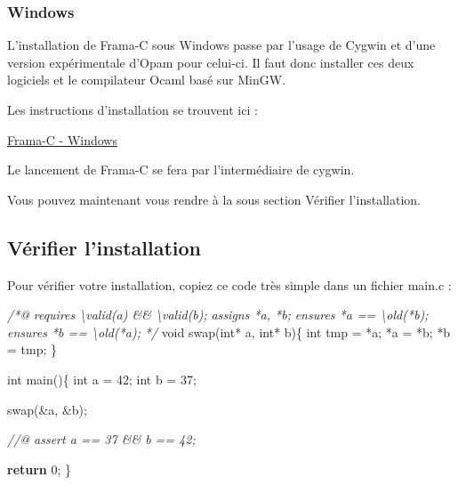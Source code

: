 \documentclass[12pt,francais,]{scrbook}
\newenvironment{Shaded}{}{}
\newcommand{\KeywordTok}[1]{\textcolor[rgb]{0.00,0.44,0.13}{\textbf{{#1}}}}
\newcommand{\DataTypeTok}[1]{\textcolor[rgb]{0.56,0.13,0.00}{{#1}}}
\newcommand{\DecValTok}[1]{\textcolor[rgb]{0.25,0.63,0.44}{{#1}}}
\newcommand{\CommentTok}[1]{\textcolor[rgb]{0.38,0.63,0.69}{\textit{{#1}}}}
\newcommand{\NormalTok}[1]{{#1}}
\begin{document}
\subsubsection{Windows}\label{windows}

L'installation de Frama-C sous Windows passe par l'usage de Cygwin et
d'une version expérimentale d'Opam pour celui-ci. Il faut donc installer
ces deux logiciels et le compilateur Ocaml basé sur MinGW.

Les instructions d'installation se trouvent ici :

\href{https://bts.frama-c.com/dokuwiki/doku.php?id=mantis:frama-c:compiling_from_source}{Frama-C
- Windows}

Le lancement de Frama-C se fera par l'intermédiaire de cygwin.

Vous pouvez maintenant vous rendre à la sous section \og{}Vérifier
l'installation\fg{}.

\subsection{Vérifier l'installation}\label{vuxe9rifier-linstallation}

Pour vérifier votre installation, copiez ce code très simple dans un
fichier \og{}main.c\fg{} :

\begin{footnotesize}\begin{Shaded}
\begin{Highlighting}[]
\CommentTok{/*@}
\CommentTok{  requires \textbackslash{}valid(a) && \textbackslash{}valid(b);}
\CommentTok{  assigns *a, *b;}
\CommentTok{  ensures *a == \textbackslash{}old(*b);}
\CommentTok{  ensures *b == \textbackslash{}old(*a);}
\CommentTok{*/}
\DataTypeTok{void} \NormalTok{swap(}\DataTypeTok{int}\NormalTok{* a, }\DataTypeTok{int}\NormalTok{* b)\{}
  \DataTypeTok{int} \NormalTok{tmp = *a;}
  \NormalTok{*a = *b;}
  \NormalTok{*b = tmp;}
\NormalTok{\}}

\DataTypeTok{int} \NormalTok{main()\{}
  \DataTypeTok{int} \NormalTok{a = }\DecValTok{42}\NormalTok{;}
  \DataTypeTok{int} \NormalTok{b = }\DecValTok{37}\NormalTok{;}

  \NormalTok{swap(&a, &b);}

  \CommentTok{//@ assert a == 37 && b == 42;}

  \KeywordTok{return} \DecValTok{0}\NormalTok{;}
\NormalTok{\}}
\end{Highlighting}
\end{Shaded}\end{footnotesize}
\end{document}

